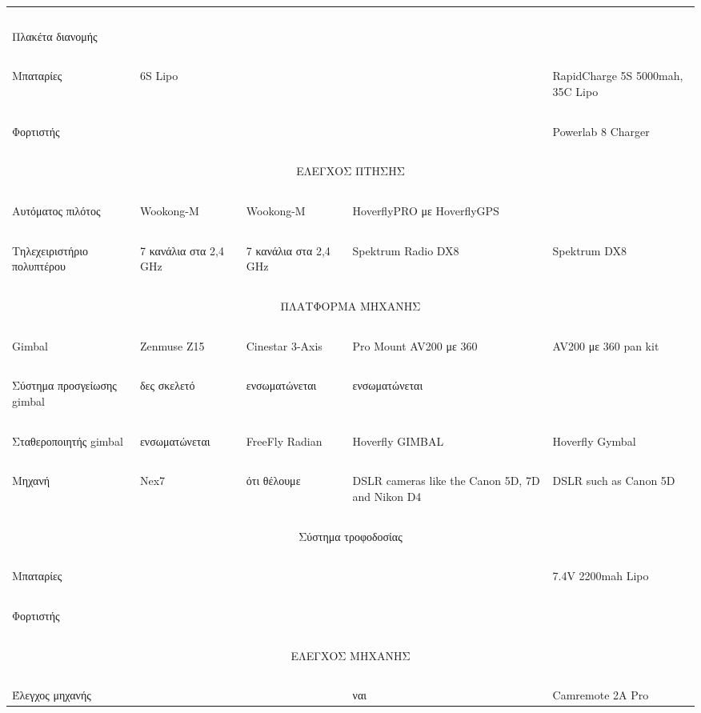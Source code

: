\documentclass[a4paper, 12pt, twoside]{report}
\begin{document}
\begin{landscape}
\begin{longtable}{ m{3cm} m{2.2cm} m{2.2cm} m{2.2cm} m{2.2cm} }
				\hdashline
				~\\
				Πλακέτα διανομής & & & & \\
				\hdashline
				~\\
				Μπαταρίες & 6S Lipo & & & RapidCharge 5S 5000mah, 35C Lipo\\
				\hdashline
				~\\
				Φορτιστής & & & & Powerlab 8 Charger\\
				\hdashline
				~\\
				\multicolumn{5}{c}{ΕΛΕΓΧΟΣ ΠΤΗΣΗΣ}\\
				\hline
				~\\
				Αυτόματος πιλότος & Wookong-M & Wookong-M & HoverflyPRO με HoverflyGPS & \\
				\hdashline
				~\\
				Τηλεχειριστήριο πολυπτέρου & 7 κανάλια στα 2,4 GHz & 7 κανάλια στα 2,4 GHz & Spektrum Radio DX8 & Spektrum DX8\\
				\hdashline
				~\\
				\multicolumn{5}{c}{ΠΛΑΤΦΟΡΜΑ ΜΗΧΑΝΗΣ}\\
				\hline
				~\\
				Gimbal & Zenmuse Z15 & Cinestar 3-Axis & Pro Mount AV200 με 360 & AV200 με 360 pan kit\\
				\hdashline
				~\\
				Σύστημα προσγείωσης gimbal & δες σκελετό & ενσωματώνεται & ενσωματώνεται & \\
				\hdashline
				~\\
				Σταθεροποιητής gimbal & ενσωματώνεται & FreeFly Radian & Hoverfly GIMBAL & Hoverfly Gymbal\\
				\hdashline
				~\\
				Μηχανή & Nex7 & ότι θέλουμε & DSLR cameras like the Canon 5D, 7D and Nikon D4 & DSLR such as Canon 5D\\
				\hdashline
				~\\
				\multicolumn{5}{c}{Σύστημα τροφοδοσίας}\\
				\hdashline
				~\\
				Μπαταρίες & & & & 7.4V 2200mah Lipo\\
				\hdashline
				~\\
				Φορτιστής & & & & \\
				\hdashline
				~\\
				\multicolumn{5}{c}{ΕΛΕΓΧΟΣ ΜΗΧΑΝΗΣ}\\
				\hline
				~\\
				Έλεγχος μηχανής & & & ναι & Camremote 2A Pro\\

\end{longtable}
\end{landscape}
\end{document}
